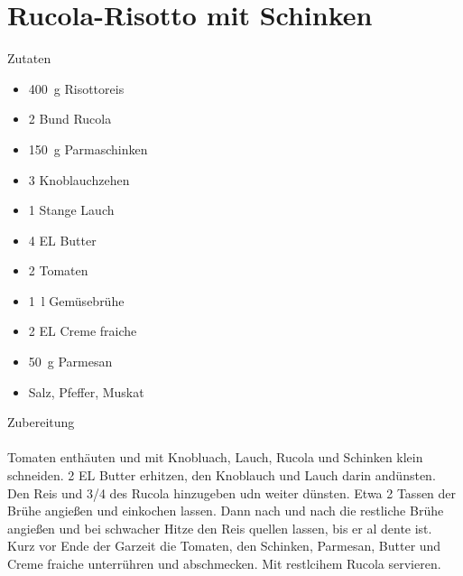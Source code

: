 \section*{Rucola-Risotto mit Schinken}
\ihead{}\ohead{}
\cfoot{}
{\Large Zutaten}
\begin{multicols}{2}
\begin{itemize}
    \item \SI{400}{g} Risottoreis
    \item \num{2} Bund Rucola
    \item \SI{150}{g} Parmaschinken
    \item \num{3} Knoblauchzehen
    \item \num{1} Stange Lauch
    \item \num{4} EL Butter
    \item \num{2} Tomaten
    \item \SI{1}{l} Gemüsebrühe
    \item \num{2} EL Creme fraiche
    \item \SI{50}{g} Parmesan
    \item Salz, Pfeffer, Muskat
\end{itemize}
\end{multicols}
\noindent
{\Large Zubereitung}\\
\\
Tomaten enthäuten und mit Knobluach, Lauch, Rucola und Schinken klein schneiden.
\num{2} EL Butter erhitzen, den Knoblauch und Lauch darin andünsten.
Den Reis und \num{3/4} des Rucola hinzugeben udn weiter dünsten.
Etwa \num{2} Tassen der Brühe angießen und einkochen lassen. 
Dann nach und nach die restliche Brühe angießen und bei schwacher Hitze den Reis quellen lassen, bis er al dente ist.
Kurz vor Ende der Garzeit die Tomaten, den Schinken, Parmesan, Butter und Creme fraiche unterrühren und abschmecken. Mit restlcihem Rucola servieren.